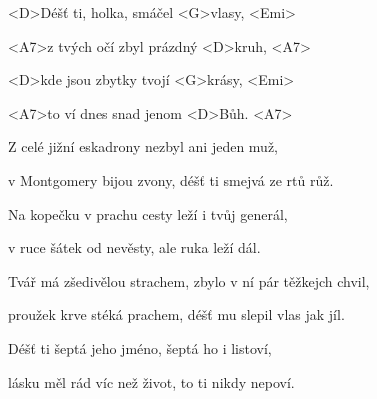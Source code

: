


\zs
<D>Déšť ti, holka, smáčel <G>vlasy, <Emi>

<A7>z tvých očí zbyl prázdný <D>kruh, <A7>

<D>kde jsou zbytky tvojí <G>krásy, <Emi>

<A7>to ví dnes snad jenom <D>Bůh. <A7>
\ks

\zr
Z celé jižní eskadrony
nezbyl ani jeden muž,

v Montgomery bijou zvony,
déšť ti smejvá ze rtů růž.
\kr

\zs
Na kopečku v prachu cesty
leží i tvůj generál,

v ruce šátek od nevěsty,
ale ruka leží dál.
\ks

\zr\kr

\zs
Tvář má zšedivělou strachem,
zbylo v ní pár těžkejch chvil,

proužek krve stéká prachem,
déšť mu slepil vlas jak jíl.
\ks

\zr\kr

\zs
Déšť ti šeptá jeho jméno,
šeptá ho i listoví,

lásku měl rád víc než život,
to ti nikdy nepoví.
\ks

\zr\kr

\kp
